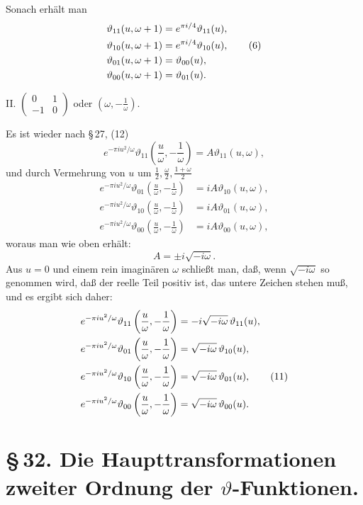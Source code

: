 \documentclass[11pt]{article}
\providecommand{\tht}{\vartheta}
\begin{document}
Sonach erhält man
\begin{align}
\tht_{11}(u,\omega+1)&=e^{\pi i/4}\tht_{11}(u),\notag\\
\tht_{10}(u,\omega+1)&=e^{\pi i/4}\tht_{10}(u), \tag{6}\\
\tht_{01}(u,\omega+1)&=\tht_{00}(u),\notag\\
\tht_{00}(u,\omega+1)&=\tht_{01}(u).\notag
\end{align}

II. $\begin{pmatrix}0&1\\-1&0\end{pmatrix}$ oder $\left(\omega,-\frac1\omega\right)$.

Es ist wieder nach \S\,27, (12)
\begin{equation}
e^{-\pi i u^2/\omega}\tht_{11}\left(\frac{u}{\omega},-\frac1\omega\right)
=A\tht_{11}(u,\omega), \tag{7}
\end{equation}
und durch Vermehrung von $u$ um $\frac12,\frac{\omega}{2},\frac{1+\omega}{2}$
\begin{align}
e^{-\pi i u^2/\omega}\tht_{01}\left(\frac{u}{\omega},-\frac1\omega\right)&=iA\tht_{10}(u,\omega), \tag{8}\\
e^{-\pi i u^2/\omega}\tht_{10}\left(\frac{u}{\omega},-\frac1\omega\right)&=iA\tht_{01}(u,\omega), \tag{9}\\
e^{-\pi i u^2/\omega}\tht_{00}\left(\frac{u}{\omega},-\frac1\omega\right)&=iA\tht_{00}(u,\omega), \tag{10}
\end{align}
woraus man wie oben erhält:
\[
A=\pm i\sqrt{-i\omega}.
\]
Aus $u=0$ und einem rein imaginären $\omega$ schließt man, daß, wenn $\sqrt{-i\omega}$ so genommen wird, daß der reelle Teil positiv ist, das untere Zeichen stehen muß, und es ergibt sich daher:
\begin{align}
e^{-\pi i u^2/\omega}\tht_{11}\left(\frac{u}{\omega},-\frac1\omega\right)&=-i\sqrt{-i\omega}\,\tht_{11}(u),\notag\\
e^{-\pi i u^2/\omega}\tht_{01}\left(\frac{u}{\omega},-\frac1\omega\right)&=\sqrt{-i\omega}\,\tht_{10}(u),\notag\\
e^{-\pi i u^2/\omega}\tht_{10}\left(\frac{u}{\omega},-\frac1\omega\right)&=\sqrt{-i\omega}\,\tht_{01}(u), \tag{11}\\
e^{-\pi i u^2/\omega}\tht_{00}\left(\frac{u}{\omega},-\frac1\omega\right)&=\sqrt{-i\omega}\,\tht_{00}(u).\notag
\end{align}




\section*{\S\,32. Die Haupttransformationen zweiter Ordnung der $\vartheta$-Funktionen.}
\end{document}
